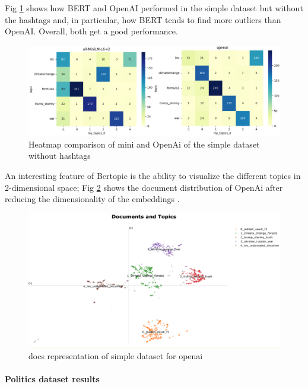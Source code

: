 Fig \ref{figure:supervised heatmap1} shows how BERT and OpenAI performed in the simple dataset but without the hashtags and, in particular, how BERT tends to find more outliers than OpenAI. Overall, both get a good performance.


\begin{figure}[h]
    \centering %
        \includegraphics[width=0.99\linewidth]{Chapter4/figures/bert_vs_openai_heatmap.png} 
    \caption{Heatmap comparison of mini and OpenAi of the simple dataset without hashtags}
    \label{figure:supervised heatmap1} %
\end{figure}

An interesting feature of Bertopic is the ability to visualize the different topics in 2-dimensional space; Fig \ref{fig:openai docs} shows the document distribution of OpenAi after reducing the dimensionality of the embeddings .

\begin{figure}
    \centering
    \includegraphics[width=1\linewidth]{Chapter4/figures/openai_doc_viz.png}
    \caption{docs representation of simple dataset for openai}
    \label{fig:openai docs}
\end{figure}


\paragraph{Politics dataset results}

